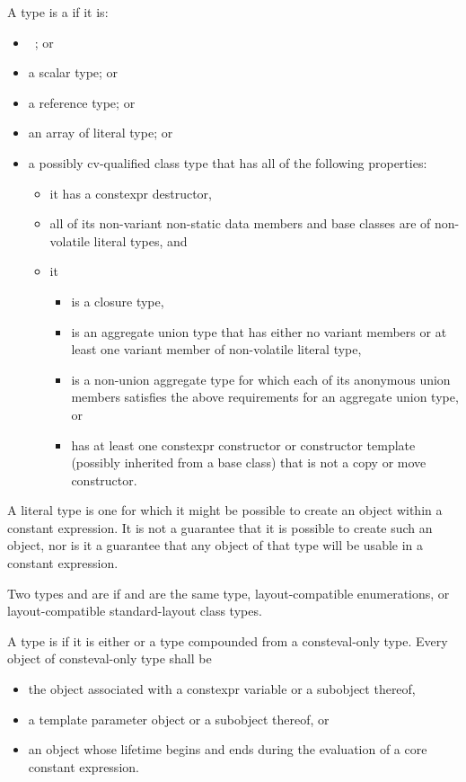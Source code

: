 \pnum
\label{term.literal.type}%
A type is a  if it is:
\begin{itemize}
\item \cv{}~; or
\item a scalar type; or
\item a reference type; or
\item an array of literal type; or
\item a possibly cv-qualified class type that
has all of the following properties:
\begin{itemize}
\item it has a constexpr destructor,
\item all of its non-variant non-static data members and base classes are of non-volatile literal types, and
\item it
\begin{itemize}
\item is a closure type,
\item is an aggregate union type that has either
no variant members or
at least one variant member of non-volatile literal type,
\item is a non-union aggregate type for which
each of its anonymous union members
satisfies the above requirements for an aggregate union type, or
\item has at least one constexpr constructor or constructor template
(possibly inherited from a base class)
that is not a copy or move constructor.
\end{itemize}
\end{itemize}
\end{itemize}
\begin{note}
A literal type is one for which
it might be possible to create an object
within a constant expression.
It is not a guarantee that it is possible to create such an object,
nor is it a guarantee that any object of that type
will be usable in a constant expression.
\end{note}

\pnum
\label{term.layout.compatible.type}%
Two types   and   are
if  and  are the same type,
layout-compatible enumerations, or
layout-compatible standard-layout class types.

\pnum
A type is  if it is either
 or
a type compounded from a consteval-only type.
Every object of consteval-only type shall be
\begin{itemize}
\item
the object associated with a constexpr variable or a subobject thereof,
\item
a template parameter object or a subobject thereof, or
\item
an object whose lifetime begins and ends
during the evaluation of a core constant expression.
\end{itemize}

